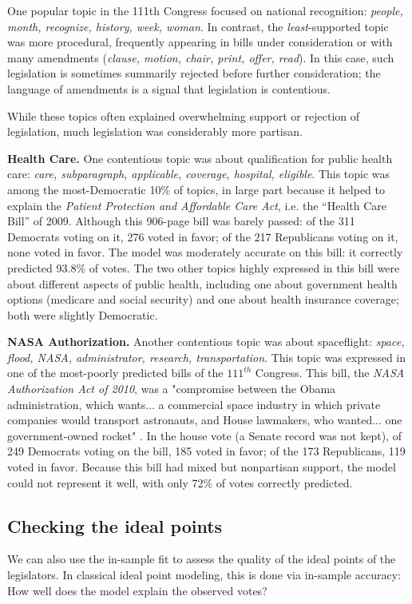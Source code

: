 One popular topic in the 111th Congress focused on national
recognition: \emph{people, month, recognize, history, week, woman}.
In contrast, the \emph{least}-supported topic was more procedural,
frequently appearing in bills under consideration or with many
amendments (\emph{clause, motion, chair, print, offer, read}).  In
this case, such legislation is sometimes summarily rejected before
further consideration; the language of amendments is a signal that
legislation is contentious.

While these topics often explained overwhelming support or rejection
of legislation, much legislation was considerably more partisan.

\textbf{Health Care.}  One contentious topic was about
qualification for public health care: \emph{care, subparagraph,
applicable, coverage, hospital, eligible}.  This topic was among the
most-Democratic 10\% of topics, in large part because it helped to
explain the \emph{Patient Protection and Affordable Care Act},
i.e. the ``Health Care Bill'' of 2009.  Although this 906-page bill
was barely passed: of the 311 Democrats voting on
it, 276 voted in favor; of the 217 Republicans voting on it, none
voted in favor.  The model was moderately accurate on this bill: it
correctly predicted 93.8\% of votes.  The two other topics highly
expressed in this bill were about different aspects of public health,
including one about government health options (medicare and social
security) and one about health insurance coverage; both were slightly
Democratic.

\textbf{NASA Authorization.}
Another contentious topic was about spaceflight: \emph{space, flood,
NASA, administrator, research, transportation}.
This topic was expressed in one of the most-poorly predicted bills of
the $111^{th}$ Congress.  This bill, the \emph{NASA Authorization Act
of 2010}, was a "compromise between the Obama administration, which
wants... a commercial space industry in which private companies would
transport astronauts, and House lawmakers, who wanted... one
government-owned rocket" \cite{herszenhorn:2010}.  In the house vote
(a Senate record was not kept), of 249 Democrats voting on the bill,
185 voted in favor; of the 173 Republicans, 119 voted in favor.
Because this bill had mixed but nonpartisan support, the model could
not represent it well, with only 72\% of votes correctly predicted.

\subsection{Checking the ideal points}
We can also use the in-sample fit to assess the quality of the ideal
points of the legislators.  In classical ideal point modeling, this is
done via in-sample accuracy: How well does the model explain the
observed votes?

